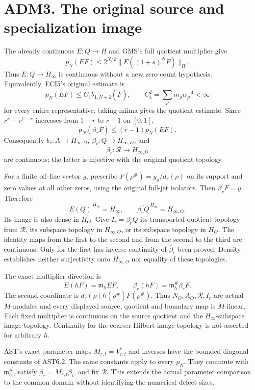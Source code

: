 \section{ADM3. The original source and specialization
image}\label{adm3.-the-original-source-and-specialization-image}

The already continuous \(E:Q\to H\) and GMS's full quotient multiplier
give \[
p_N(EF)\le2^{N/2}\|E((1+s)^NF)\|_H.
\tag{ADM3.1}
\] Thus \(E:Q\to H_\infty\) is continuous without a new zero-count
hypothesis. Equivalently, ECI5's original estimate is \[
p_N(EF)\le C_4 b_{1,N+2}(\widetilde F),\qquad
C_4^2=\sum_\rho m_\rho w_\rho^{-4}<\infty
\tag{ADM3.2}
\] for every entire representative; taking infima gives the quotient
estimate. Since \(r^x-r^{1-x}\) increases from \(1-r\) to \(r-1\) on
\([0,1]\), \[
p_N(\beta_rF)\le(r-1)p_N(EF).
\tag{ADM3.3}
\] Consequently \(b_r:A\to H_{\infty,O}\),
\(\beta_r:Q\to H_{\infty,O}\), and \[
\overline\beta_r:\mathcal R\longrightarrow H_{\infty,O}
\tag{ADM3.4}
\] are continuous; the latter is injective with the original quotient
topology.

For a finite off-line vector \(y\), prescribe
\(F(\rho^\#)=y_\rho/\overline{d_r(\rho)}\) on its support and zero
values at all other zeros, using the original full-jet isolators. Then
\(\beta_rF=y\). Therefore \[
\overline{E(Q)}^{\,H_\infty}=H_\infty,\qquad
\overline{\beta_rQ}^{\,H_\infty}=H_{\infty,O}.
\tag{ADM3.5}
\] Its image is also dense in \(H_O\). Give \(I_r=\beta_rQ\) its
transported quotient topology from \(\mathcal R\), its subspace topology
in \(H_{\infty,O}\), or its subspace topology in \(H_O\). The identity
maps from the first to the second and from the second to the third are
continuous. Only for the first has inverse continuity of
\(\overline\beta_r\) been proved. Density establishes neither
surjectivity onto \(H_{\infty,O}\) nor equality of these topologies.

The exact multiplier direction is \[
E(hF)=\mathfrak m_hEF,\qquad
\beta_r(hF)=\mathfrak m_h^\#\beta_rF.
\tag{ADM3.6}
\] The second coordinate is
\(\overline{d_r(\rho)}h(\rho^\#)F(\rho^\#)\). Thus
\(N_O,A_O,\mathcal R,I_r\) are actual \(M\)-modules and every displayed
source, quotient and boundary map is \(M\)-linear. Each fixed multiplier
is continuous on the source quotient and the \(H_\infty\)-subspace image
topology. Continuity for the coarser Hilbert image topology is not
asserted for arbitrary \(h\).

AST's exact parameter maps \(M_{r,t}=V_{r,t}^*\) and inverses have the
bounded diagonal constants of AST6.2. The same constants apply to every
\(p_N\). They commute with \(\mathfrak m_h^\#\), satisfy
\(\beta_r=M_{r,t}\beta_t\), and fix \(\mathcal R\). This extends the
actual parameter comparison to the common domain without identifying the
numerical defect sizes.

